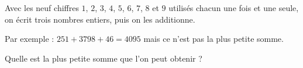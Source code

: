 
\begin{exercice}\label{exosmath-0765}

Avec les neuf chiffres $1$, $2$, $3$, $4$, $5$, $6$, $7$, $8$ et $9$ utilisés chacun une fois et une seule, on écrit trois nombres entiers,
puis on les additionne.

Par exemple : $251 + 3 798 + 46 = 4 095$ mais ce n'est pas la plus petite somme.

Quelle est la plus petite somme que l'on peut obtenir ?

\end{exercice}
